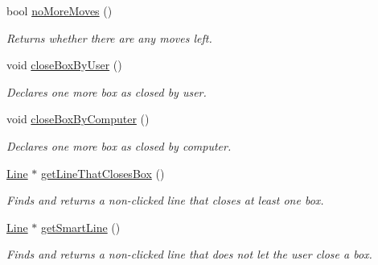 \begin{DoxyCompactItemize}
bool \hyperlink{classGame3Scene_a1e1507f4dbb2a32cb6a22c97fc3f0877}{no\-More\-Moves} ()
\begin{DoxyCompactList}\small\item\em \-Returns whether there are any moves left. \end{DoxyCompactList}\item 
\hypertarget{classGame3Scene_a32f5b4495727883849959f0d832ac398}{void \hyperlink{classGame3Scene_a32f5b4495727883849959f0d832ac398}{close\-Box\-By\-User} ()}\label{classGame3Scene_a32f5b4495727883849959f0d832ac398}

\begin{DoxyCompactList}\small\item\em \-Declares one more box as closed by user. \end{DoxyCompactList}\item 
\hypertarget{classGame3Scene_a866b77e044e76b8ea79447cc9f4a31f1}{void \hyperlink{classGame3Scene_a866b77e044e76b8ea79447cc9f4a31f1}{close\-Box\-By\-Computer} ()}\label{classGame3Scene_a866b77e044e76b8ea79447cc9f4a31f1}

\begin{DoxyCompactList}\small\item\em \-Declares one more box as closed by computer. \end{DoxyCompactList}\item 
\hyperlink{classLine}{\-Line} $\ast$ \hyperlink{classGame3Scene_a68d775901007417eb7f67e3567d83b3f}{get\-Line\-That\-Closes\-Box} ()
\begin{DoxyCompactList}\small\item\em \-Finds and returns a non-\/clicked line that closes at least one box. \end{DoxyCompactList}\item 
\hyperlink{classLine}{\-Line} $\ast$ \hyperlink{classGame3Scene_a0ed388d4e3163fa39d05547b98794366}{get\-Smart\-Line} ()
\begin{DoxyCompactList}\small\item\em \-Finds and returns a non-\/clicked line that does not let the user close a box. \end{DoxyCompactList}\end{DoxyCompactItemize}



